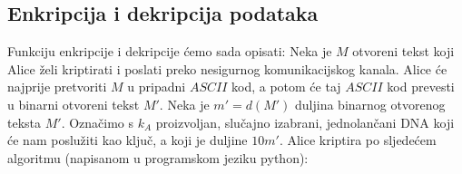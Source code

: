 \documentclass[a4paper,oneside,12pt]{memoir} %
\begin{document}
\begin{spacing}{1.5}
\section{Enkripcija i dekripcija podataka}
\label{sec:EDDNA}
Funkciju enkripcije i dekripcije ćemo sada opisati:
Neka je $M$ otvoreni tekst koji Alice želi kriptirati i poslati preko nesigurnog komunikacijskog kanala. Alice će najprije pretvoriti $M$ u pripadni $ASCII$ kod, a potom će taj $ASCII$ kod prevesti u binarni otvoreni tekst $M'$. Neka je $m'=d(M')$ duljina binarnog otvorenog teksta $M'$. Označimo s $k_A$ proizvoljan, slučajno izabrani, jednolančani DNA koji će nam poslužiti kao ključ, a koji je duljine $10m'$. Alice kriptira po sljedećem algoritmu (napisanom u programskom jeziku python):

\newpage
\nocite{*}


\end{spacing}
\end{document}
